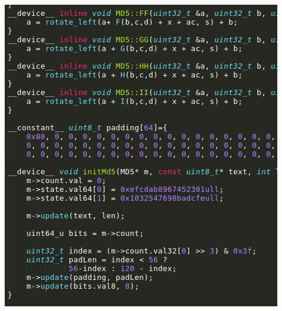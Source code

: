 \documentclass{beamer}
\begin{document}
\begin{frame}
\begin{multicols}{2}
		\includegraphics[height=.7\textheight]{md5_2.png}
	\end{multicols}
\end{frame}

\end{document}
